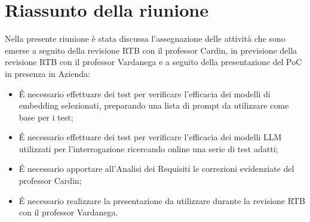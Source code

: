\section{Riassunto della riunione}
Nella presente riunione è stata discussa l'assegnazione delle attività che sono emerse a seguito della revisione RTB con il professor Cardin, in previsione della revisione RTB con il professor Vardanega e a seguito della presentazione del PoC in presenza in Azienda:
\begin{itemize}
    \item \'E necessario effettuare dei test per verificare l'efficacia dei modelli di embedding selezionati, preparando una lista di prompt da utilizzare come base per i test;
    \item \'E necessario effettuare dei test per verificare l'efficacia dei modelli LLM utilizzati per l'interrogazione ricercando online una serie di test adatti; 
    \item \'E necessario apportare all'Analisi dei Requisiti le correzioni evidenziate del professor Cardin;
    \item \'E necessario realizzare la presentazione da utilizzare durante la revisione RTB con il professor Vardanega.
\end{itemize}